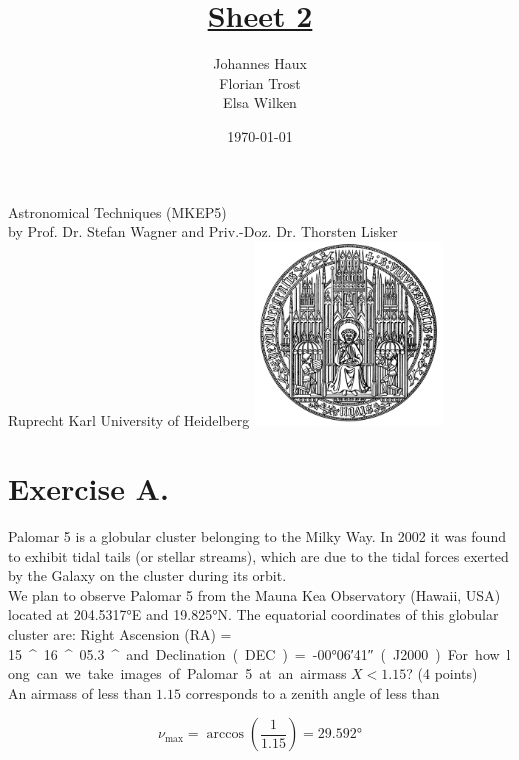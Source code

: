 \documentclass[11pt,a4paper,twoside]{article}
\title{\LARGE \underline {Sheet 2}}
\author{Johannes Haux \\ Florian Trost \\ Elsa Wilken}
\date{\today}
\begin{document}
\maketitle
\thispagestyle{empty}

\begin{center}
  Astronomical Techniques (MKEP5) \\
  \baselineskip35pt
  by Prof. Dr. Stefan Wagner and Priv.-Doz. Dr. Thorsten Lisker \\
  \baselineskip60pt
  Ruprecht Karl University of Heidelberg
\vskip 40pt
\includegraphics[width=5cm]{pic/UniHD.png}

\end{center}

\newpage
\setcounter{page}{1}		%

\section*{Exercise A.} 

Palomar 5 is a globular cluster belonging to the Milky Way. In 2002 it was found to exhibit tidal tails (or stellar streams), which are due to the tidal forces exerted by the Galaxy on the cluster during its orbit. \\

We plan to observe Palomar 5 from the Mauna Kea Observatory (Hawaii, USA) located at \ang{204.5317}E and \ang{19.825}N. The equatorial coordinates of this globular cluster are: Right Ascension (RA) = \SI{15}{^\hour} \SI{16}{^\minute} \SI{05.3}{^\second} and Declination (DEC) = \ang{-00;06;41} (J2000).
For how long can we take images of Palomar 5 at an airmass $X < 1.15$? (4 points) \\

An airmass of less than $1.15$ corresponds to a zenith angle of less than 

\begin{equation}
 \nu_{\text{max}} = \arccos{\left( \frac{1}{1.15} \right)} = \ang{29.592}
\end{equation}
\end{document}
